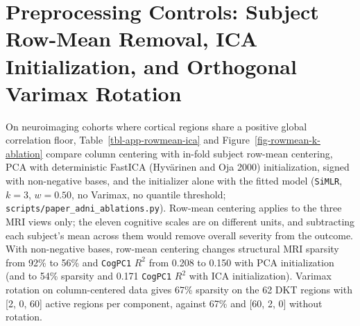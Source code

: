 \documentclass[
  10pt,
  letterpaper,
]{report}
\begin{document}
\section{Preprocessing Controls: Subject Row-Mean Removal, ICA
Initialization, and Orthogonal Varimax
Rotation}\label{preprocessing-controls-subject-row-mean-removal-ica-initialization-and-orthogonal-varimax-rotation}

On neuroimaging cohorts where cortical regions share a positive global
correlation floor, Table~\ref{tbl-app-rowmean-ica} and
Figure~\ref{fig-rowmean-k-ablation} compare column centering with
in-fold subject row-mean centering, PCA with deterministic FastICA
(Hyvärinen and Oja 2000) initialization, signed with non-negative bases,
and the initializer alone with the fitted model (\texttt{SiMLR},
\(k = 3\), \(w = 0.50\), no Varimax, no quantile threshold;
\texttt{scripts/paper\_adni\_ablations.py}). Row-mean centering applies
to the three MRI views only; the eleven cognitive scales are on
different units, and subtracting each subject's mean across them would
remove overall severity from the outcome. With non-negative bases,
row-mean centering changes structural MRI sparsity from 92\% to 56\% and
\texttt{CogPC1} \(R^2\) from 0.208 to 0.150 with PCA initialization (and
to 54\% sparsity and 0.171 \texttt{CogPC1} \(R^2\) with ICA
initialization). Varimax rotation on column-centered data gives 67\%
sparsity on the 62 DKT regions with {[}2, 0, 60{]} active regions per
component, against 67\% and {[}60, 2, 0{]} without rotation.
\end{document}
